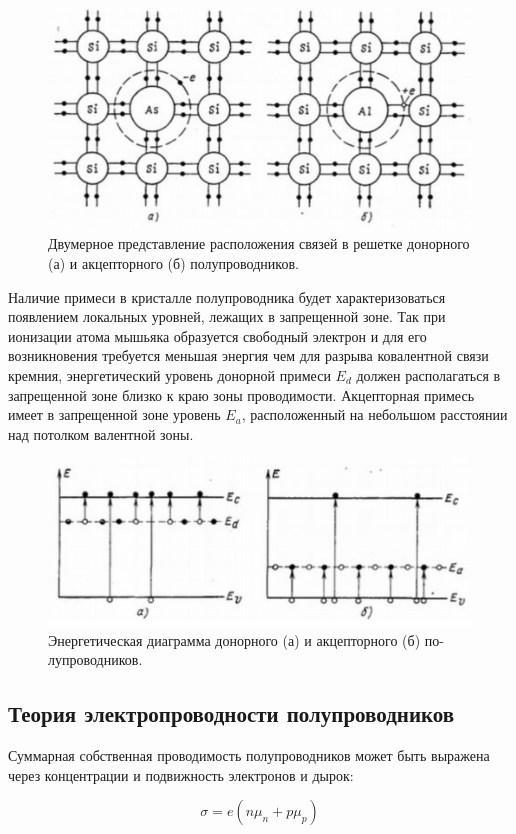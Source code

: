 \documentclass[a4paper, 12pt]{article}
\begin{document}
\begin{figure}[H]
    \centering
    \includegraphics[width=0.7\linewidth]{Theor_pic_1.png}
    \caption{Двумерное представление расположения связей в решетке донорного (а) и акцепторного (б) полупроводников.}
    \label{fig:theor_pic_1}
\end{figure}
 
Наличие примеси в кристалле полупроводника будет характеризоваться появлением локальных уровней, лежащих в запрещенной зоне. Так при ионизации атома мышьяка образуется свободный электрон и для его возникновения требуется меньшая энергия чем для разрыва ковалентной связи кремния, энергетический уровень донорной примеси $E_d$ должен располагаться в запрещенной зоне близко к краю зоны проводимости. Акцепторная примесь имеет в запрещенной зоне уровень $E_a$, расположенный на небольшом расстоянии над потолком валентной зоны.

\begin{figure}[H]
    \centering
    \includegraphics[width=0.7\linewidth]{Theor_pic_2.png}
    \caption{Энергетическая диаграмма донорного (а) и акцепторного (б) по-
лупроводников.}
    \label{fig:theor_pic_1}
\end{figure}

\subsection*{Теория электропроводности полупроводников}

Суммарная собственная проводимость полупроводников может быть
выражена через концентрации и подвижность электронов и дырок:

\begin{equation}
    \sigma = e(n \mu_n + p \mu_p)
\end{equation}
\end{document}
